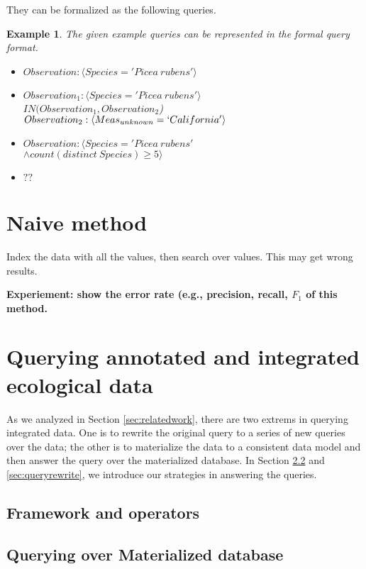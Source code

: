 \documentclass[conference]{IEEEtran}
\newtheorem{example}{Example}[section]
\begin{document}
They can be formalized as the following queries. 

\begin{example}
The given example queries can be represented in the formal query
format. 
\begin{itemize}
\item $Observation: \langle Species='Picea~rubens'\rangle$
\item $Observation_1: \langle Species='Picea~rubens'\rangle$\\
  $IN(Observation_1, Observation_2$) \\
$Observation_2: \langle Meas_{unknown}=`California'\rangle$
\item $Observation: \langle Species='Picea~rubens' $\\
$\wedge
  count(distinct~Species)\geq 5\rangle$
\item $??$
\end{itemize}

\end{example}

\section{Naive method}\label{sec:naive}
Index the data with all the values, then search over values. 
This may get wrong results. 

{\bf Experiement: show the error rate (e.g., precision, recall, $F_1$ of this method.}

\section{Querying annotated and integrated ecological data}

As we analyzed in Section \ref{sec:relatedwork}, there are two extrems
in querying integrated data. 
One is to rewrite the original query to a series of new queries over
the data; the other is to materialize the data to a consistent data
model and then answer the query over the materialized database. 
In Section \ref{sec:matdb} and \ref{sec:queryrewrite}, we introduce
our strategies in answering the queries. 

\subsection{Framework and operators}


\subsection{Querying over Materialized database}\label{sec:matdb}
\end{document}

